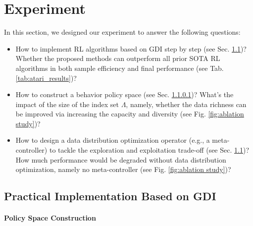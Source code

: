 \documentclass[nohyperref]{article}
\theoremstyle{plain}
\begin{document}
\section{Experiment}
\label{sec: experiment}
In this section, we designed our experiment to answer the following questions:
\begin{itemize}
    \item How to implement RL algorithms based on GDI step by step (see Sec. \ref{sec: Practical Implement Based on GDI})?  Whether the proposed methods can outperform all prior SOTA RL algorithms in both sample efficiency and final performance  (see Tab. \ref{tab:atari_results})?
    \item How to construct a behavior policy space (see Sec. \ref{sec: Policy Space Construction})? What's the impact of the size of the index set $\Lambda$, namely, whether the data richness can be improved via increasing the capacity and diversity (see Fig. \ref{fig:ablation study})?
    \item How to design a data distribution optimization operator (e.g., a meta-controller) to tackle the exploration and exploitation trade-off (see Sec. \ref{sec: Practical Implement Based on GDI})? How much performance would be degraded without data distribution optimization, namely no meta-controller (see Fig. \ref{fig:ablation study})?
\end{itemize}

\subsection{Practical Implementation Based on GDI}
\label{sec: Practical Implement Based on GDI}


\paragraph{Policy Space Construction}
\label{sec: Policy Space Construction}
\end{document}
